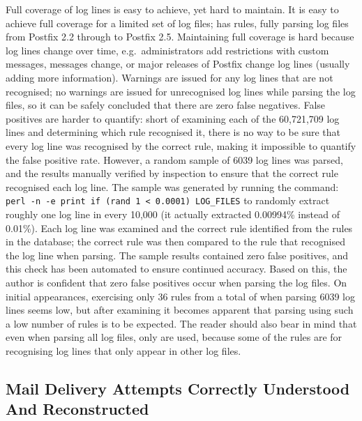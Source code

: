 Full coverage of log lines is easy to achieve, yet hard to maintain.  It is
easy to achieve full coverage for a limited set of log files; \parsername{}
has \numberOFrules{} rules, fully parsing \numberOFlogFILESall{} log files
from Postfix 2.2 through to Postfix 2.5.  Maintaining full coverage is hard
because log lines change over time, e.g.\ administrators add restrictions
with custom messages,  messages change, or major releases of
Postfix change log lines (usually adding more information).  Warnings are
issued for any log lines that are not recognised; no warnings are issued
for unrecognised log lines while parsing the \numberOFlogFILES{} log files,
so it can be safely concluded that there are zero false negatives.  False
positives are harder to quantify: short of examining each of the 60,721,709
log lines and determining which rule recognised it, there is no way to be
sure that every log line was recognised by the correct rule, making it
impossible to quantify the false positive rate.  However, a random sample
of 6039 log lines was parsed, and the results manually verified by
inspection to ensure that the correct rule recognised each log line.  The
sample was generated by running the command: \texttt{perl -n -e
\singlequote{}print if (rand 1 < 0.0001)\singlequote{} LOG\_FILES} to
randomly extract roughly one log line in every 10,000 (it actually
extracted 0.00994\% instead of 0.01\%).  Each log line was examined and the
correct rule identified from the \numberOFrules{} rules in the database;
the correct rule was then compared to the rule that recognised the log line
when parsing.  The sample results contained zero false positives, and this
check has been automated to ensure continued accuracy.  Based on this, the
author is confident that zero false positives occur when parsing the
\numberOFlogFILES{} log files.  On initial appearances, exercising only 36
rules from a total of \numberOFrules{} when parsing 6039 log lines seems
low, but after examining  it becomes apparent
that parsing using such a low number of rules is to be expected.  The
reader should also bear in mind that even when parsing all
\numberOFlogFILES{} log files, only \numberOFrulesMINIMUM{} are used,
because some of the rules are for recognising log lines that only appear in
other log files.

\subsection{Mail Delivery Attempts Correctly Understood And Reconstructed}


